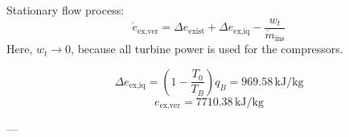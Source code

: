 Stationary flow process:  
\[
\dot{e}_{\text{ex,ver}} = \Delta e_{\text{exist}} + \Delta e_{\text{ex,iq}} - \frac{w_t}{\dot{m}_{\text{ins}}}
\]  
Here, \( w_t \to 0 \), because all turbine power is used for the compressors.  

\[
\Delta e_{\text{ex,iq}} = \left( 1 - \frac{T_0}{T_B} \right) q_B = 969.58 \, \text{kJ/kg}
\]  
\[
e_{\text{ex,ver}} = 7710.38 \, \text{kJ/kg}
\]  

---
